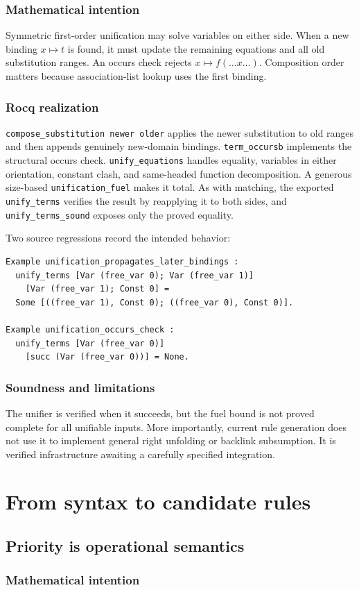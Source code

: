 \documentclass[11pt,oneside]{book}
\DeclareRobustCommand{\code}[1]{\nolinkurl{#1}}
\newcommand{\mathintent}{\subsection*{Mathematical intention}}
\newcommand{\rocqreal}{\subsection*{Rocq realization}}
\newcommand{\soundlim}{\subsection*{Soundness and limitations}}
\begin{document}
\mathintent

Symmetric first-order unification may solve variables on either side.  When a
new binding \(x\mapsto t\) is found, it must update the remaining equations and
all old substitution ranges.  An occurs check rejects \(x\mapsto f(\ldots x
\ldots)\).  Composition order matters because association-list lookup uses the
first binding.

\rocqreal

\code{compose_substitution newer older} applies the newer substitution to old
ranges and then appends genuinely new-domain bindings.
\code{term_occursb} implements the structural occurs check.
\code{unify_equations} handles equality, variables in either orientation,
constant clash, and same-headed function decomposition.  A generous size-based
\code{unification_fuel} makes it total.  As with matching, the exported
\code{unify_terms} verifies the result by reapplying it to both sides, and
\code{unify_terms_sound} exposes only the proved equality.

Two source regressions record the intended behavior:
\begin{lstlisting}[caption={Executable unification boundaries.}]
Example unification_propagates_later_bindings :
  unify_terms [Var (free_var 0); Var (free_var 1)]
    [Var (free_var 1); Const 0] =
  Some [((free_var 1), Const 0); ((free_var 0), Const 0)].

Example unification_occurs_check :
  unify_terms [Var (free_var 0)]
    [succ (Var (free_var 0))] = None.
\end{lstlisting}

\soundlim

The unifier is verified when it succeeds, but the fuel bound is not proved
complete for all unifiable inputs.  More importantly, current rule generation
does not use it to implement general right unfolding or backlink subsumption.
It is verified infrastructure awaiting a carefully specified integration.

\chapter{From syntax to candidate rules}
\label{ch:generation}

\section{Priority is operational semantics}

\mathintent
\end{document}
